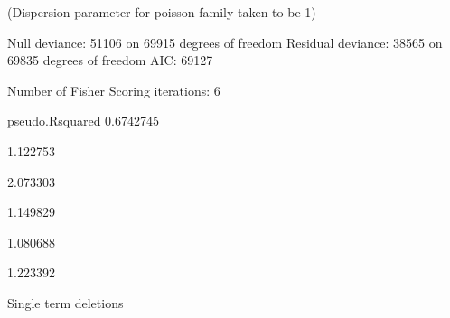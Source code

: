 \documentclass[a4paper]{article}                %
\begin{document}
\begin{Schunk}
\begin{Soutput}
(Dispersion parameter for poisson family taken to be 1)

    Null deviance: 51106  on 69915  degrees of freedom
Residual deviance: 38565  on 69835  degrees of freedom
AIC: 69127

Number of Fisher Scoring iterations: 6
\end{Soutput}
\begin{Soutput}
pseudo.Rsquared 
      0.6742745 
\end{Soutput}
\begin{Soutput}
[1] 1.122753
\end{Soutput}
\begin{Soutput}
[1] 2.073303
\end{Soutput}
\begin{Soutput}
[1] 1.149829
\end{Soutput}
\begin{Soutput}
[1] 1.080688
\end{Soutput}
\begin{Soutput}
[1] 1.223392
\end{Soutput}
\begin{Soutput}
Single term deletions


\end{Soutput}
\end{Schunk}
\end{document}
